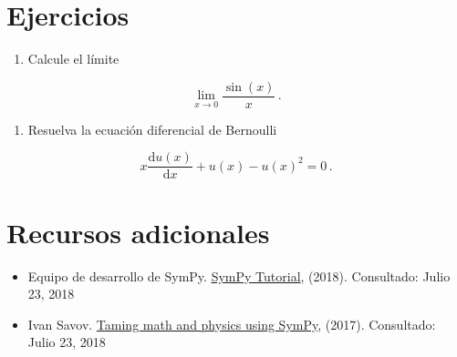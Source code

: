 \section{Ejercicios}

\begin{enumerate}
\def\labelenumi{\arabic{enumi}.}
\item
  Calcule el límite
\end{enumerate}

\[\lim_{x \rightarrow 0} \frac{\sin(x)}{x}\, .\]

\begin{enumerate}
\def\labelenumi{\arabic{enumi}.}
\setcounter{enumi}{1}
\item
  Resuelva la ecuación diferencial de Bernoulli
\end{enumerate}

\[x \frac{\mathrm{d} u(x)}{\mathrm{d}x}  + u(x) - u(x)^2 = 0\, .\]

\section{Recursos adicionales}

\begin{itemize}
\item Equipo de desarrollo de SymPy. \href{http://docs.sympy.org/latest/tutorial/index.html}{SymPy Tutorial}, (2018). Consultado: Julio 23, 2018

\item Ivan Savov. \href{https://minireference.com/static/tutorials/sympy_tutorial.pdf}{Taming math and physics using SymPy}, (2017). Consultado: Julio 23, 2018



\end{itemize}
